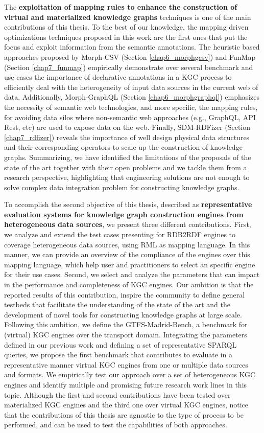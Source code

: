 The \textbf{exploitation of mapping rules to enhance the construction of virtual and materialized knowledge graphs} techniques is one of the main contributions of this thesis. To the best of our knowledge, the mapping driven optimizations techniques proposed in this work are the first ones that put the focus and exploit information from the semantic annotations. The heuristic based approaches proposed by Morph-CSV (Section \ref{chap6_morphgcsv}) and FunMap (Section \ref{chap7_funmap}) empirically demonstrate over several benchmark and use cases the importance of declarative annotations in a KGC process to efficiently deal with the heterogeneity of input data sources in the current web of data. Additionally, Morph-GraphQL (Section \ref{chap6_morphgraphql}) emphasizes the necessity of semantic web technologies, and more specific, the mapping rules, for avoiding data silos where non-semantic web approaches (e.g., GraphQL, API Rest, etc) are used to expose data on the web. Finally, SDM-RDFizer (Section \ref{chap7_rdfizer}) reveals the importance of well design physical data structures and their corresponding operators to scale-up the construction of knowledge graphs. Summarizing, we have identified the limitations of the proposals of the state of the art together with their open problems and we tackle them from a research perspective, highlighting that engineering solutions are not enough to solve complex data integration problem for constructing knowledge graphs.

To accomplish the second objective of this thesis, described as \textbf{representative evaluation systems for knowledge graph construction engines from heterogeneous data sources}, we present three different contributions. First, we analyze and extend the test cases presenting for RDB2RDF engines to coverage heterogeneous data sources, using RML as mapping language. In this manner, we can provide an overview of the compliance of the engines over this mapping language, which help user and practitioners to select an specific engine for their use cases. Second, we select and analyze the parameters that can impact in the performance and completeness of KGC engines. Our ambition is that the reported results of this contribution, inspire the community to define general testbeds that facilitate the understanding of the state of the art and the development of novel tools for constructing knowledge graphs at large scale. Following this ambition, we define the GTFS-Madrid-Bench, a benchmark for (virtual) KGC engines over the transport domain. Integrating the parameters defined in our previous work and defining a set of representative SPARQL queries, we propose the first benchmark that contributes to evaluate in a representative manner virtual KGC engines from one or multiple data sources and formats. We empirically test our approach over a set of heterogeneous KGC engines and identify multiple and promising future research work lines in this topic. Although the first and second contributions have been tested over materialized KGC engines and the third one over virtual KGC engines, notice that the contributions of this thesis are agnostic to the type of process to be performed, and can be used to test the capabilities of both approaches.


